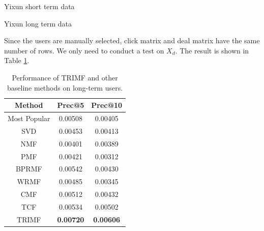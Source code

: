 \begin{subsubsection}{Yixun short term data}
\begin{table}
\end{table}
\end{subsubsection}


\begin{subsubsection}
  {Yixun long term data}
\par{Since the users are manually selected, click matrix and deal matrix have the same number of rows. We only need to conduct a test on $X_d$. The result is shown in Table \ref{longterm}.}

\begin{table}
  \centering
  \begin{tabular}{|c|c|c|}
    \hline
    Method&Prec@5&Prec@10\\
    \hline
    Most Popular&0.00508&0.00405\\
    \hline
    SVD&0.00453&0.00413\\
    \hline
    NMF&0.00401&0.00389\\
    \hline
    PMF&0.00421&0.00312\\
    \hline
    BPRMF&0.00542&0.00430\\
    \hline
    WRMF&0.00485&0.00345\\
    \hline
    CMF&0.00512&0.00432\\
    \hline
    TCF&0.00534&0.00502\\
    \hline
    TRIMF&\textbf{\color{red}0.00720}&\textbf{\color{red}0.00606}\\
    \hline
  \end{tabular}
  \caption{Performance of TRIMF and other baseline methods on long-term users.}
\label{longterm}
\end{table}
\end{subsubsection}



